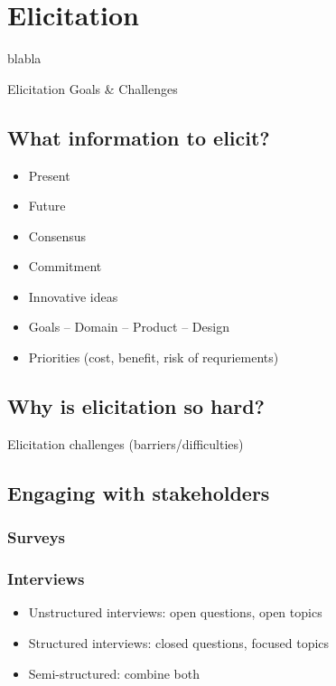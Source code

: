 
\chapter{Elicitation}%
blabla


Elicitation Goals \& Challenges%

\section{What information to elicit?}

\begin{itemize}
  \item Present
  \item Future 
  \item Consensus 
  \item Commitment 
  \item Innovative ideas
  \item Goals -- Domain -- Product -- Design
  \item Priorities (cost, benefit, risk of requriements)
\end{itemize}

\section{Why is elicitation so hard?}

Elicitation challenges (barriers/difficulties) 

\section{Engaging with stakeholders}

\subsection{Surveys}

\subsection{Interviews}

\begin{itemize}
\item Unstructured interviews: open questions, open topics
\item Structured interviews: closed questions, focused topics
\item Semi-structured: combine both
\end{itemize}


